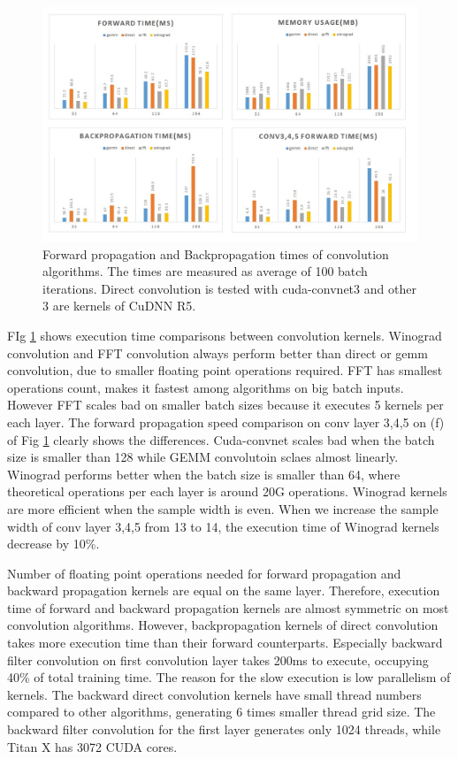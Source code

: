 \begin{figure}
  \centering
  \includegraphics[width=\linewidth]{./figures/conv_time}
  \caption{Forward propagation and Backpropagation times of convolution algorithms. The times are measured as average of 100 batch iterations. 
Direct convolution is tested with cuda-convnet3 and other 3 are kernels of CuDNN R5. }
  \label{fig_conv_time}
\end{figure}

FIg \ref{fig_conv_time} shows execution time comparisons between convolution kernels.
Winograd convolution and FFT convolution always perform better than direct or gemm convolution, due to smaller floating point operations required.
FFT has smallest operations count, makes it fastest among algorithms on big batch inputs.
However FFT scales bad on smaller batch sizes because it executes 5 kernels per each layer.
The forward propagation speed comparison on conv layer 3,4,5 on (f) of Fig \ref{fig_conv_time} clearly shows the differences.
Cuda-convnet scales bad when the batch size is smaller than 128 while GEMM convolutoin sclaes almost linearly.
Winograd performs better when the batch size is smaller than 64, where theoretical operations per each layer is around 20G operations.
Winograd kernels are more efficient when the sample width is even.
When we increase the sample width of conv layer 3,4,5 from 13 to 14, the execution time of Winograd kernels decrease by 10\%.

Number of floating point operations needed for forward propagation and backward propagation kernels are equal on the same layer.
Therefore, execution time of forward and backward propagation kernels are almost symmetric on most convolution algorithms.
However, backpropagation kernels of direct convolution takes more execution time than their forward counterparts.
Especially backward filter convolution on first convolution layer takes 200ms to execute, occupying 40\% of total training time.
The reason for the slow execution is low parallelism of kernels.
The backward direct convolution kernels have small thread numbers compared to other algorithms, generating 6 times smaller thread grid size.
The backward filter convolution for the first layer generates only 1024 threads, while Titan X has 3072 CUDA cores.

